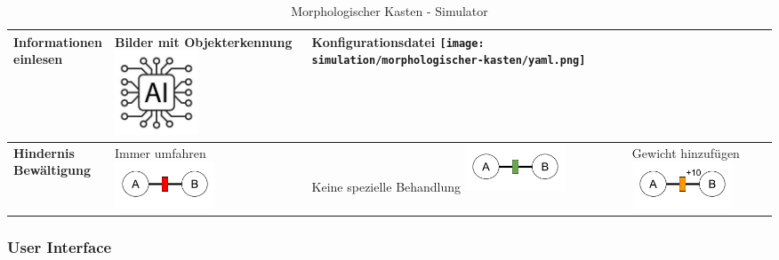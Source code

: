 \documentclass[../main.tex]{subfiles}
\begin{document}
\begin{table}[htbp!]
\begin{tabularx}{\textwidth}{| X | Y | Y | Y |}
        \textbf{Informationen \newline einlesen}  &     
        Bilder mit Objekterkennung \newline
        \includegraphics[width=2.5cm]{img/simulation/morphologischer-kasten/ai-logo.jpg}
        &
        Konfigurationsdatei \newline
        \texttt{[image: simulation/morphologischer-kasten/yaml.png]}
        &
        \\ \hline
        
        \textbf{Hindernis \newline Bewältigung}   &     
        Immer umfahren \newline
        \includegraphics[width=3cm]{img/simulation/morphologischer-kasten/hindernis-umfahren.png}
        &
        Keine spezielle Behandlung \newline
        \includegraphics[width=3cm]{img/simulation/morphologischer-kasten/hindernis-ignoriert.png}
        &
        Gewicht hinzufügen\newline
        \includegraphics[width=3cm]{img/simulation/morphologischer-kasten/hindernis-gewicht.png}
        \\ \hline
    \end{tabularx}
    \caption{Morphologischer Kasten - Simulator}
\end{table}

\subsubsection{User Interface}
\end{document}

